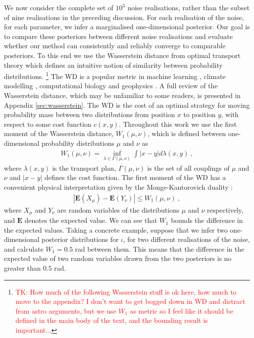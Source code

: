 \documentclass[fleqn,usenatbib,useAMS]{mnras}
\begin{document}
We now consider the complete set of $10^3$ noise realisations, rather than the subset of nine realisations in the preceding discussion. For each realisation of the noise, for each parameter, we infer a marginalised one-dimensional posterior. Our goal is to compare these posteriors between different noise realisations and evaluate whether our method can consistently and reliably converge to comparable posteriors. To this end we use the Wasserstein distance \citep[WD;][]{Wasserstein,Villani2009} from optimal transport theory which defines an intuitive notion of similarity between probability distributions. \footnote{\textcolor{red}{\tiny TK: How much of the following Wasserstein stuff is ok here, how much to move to the appendix? I don't want to get bogged down in WD and distract from astro arguments, but we use $W_1$ as metric so I feel like it should be defined in the main body of the text, and the bounding result is important...} \normalsize} The WD is a popular metric in machine learning \citep{2017arXiv170107875A}, climate modelling \citep{2022JCli...35.1215P,2023QJRMS.149..843K}, computational biology \citep{GONZALEZDELGADO2023168053} and geophysics \citep{2023GeoRL..5003880M}. A full review of the Wasserstein distance, which may be unfamiliar to some readers, is presented in Appendix \ref{sec:wasserstein}. The WD is the cost of an optimal strategy for moving probability mass between two distributions from position $x$ to position $y$, with respect to some cost function $c(x,y)$. Throughout this work we use the first moment of the Wasserstein distance, $W_1(\mu,\nu)$, which is defined between one-dimensional probability distributions $\mu$ and $\nu$ as
\begin{eqnarray}
	W_1(\mu,\nu)=  \inf_{\lambda \in \Gamma(\mu, \nu)} \int |x-y| d \lambda (x,y) \ ,
\end{eqnarray}
where $\lambda(x,y)$ is the transport plan, $\Gamma(\mu, \nu)$ is the set of all couplings of $\mu$ and $\nu$ and $ |x-y|$ defines the cost function. The first moment of the WD has a convenient physical interpretation given by the Monge-Kantorovich duality \citep{villani2003topics,Villani2009}:
\begin{eqnarray}
	| \boldsymbol{E}(X_{\mu} )-\boldsymbol{E}(Y_{\nu} ) | \leq W_1(\mu, \nu) \ , \label{eq:WDdefn}
\end{eqnarray}
where $X_{\mu}$ and $Y_{\nu}$ are random variables of the distributions $\mu$ and $\nu$ respectively, and $\boldsymbol{E}$ denotes the expected value. We can see that $W_1$ bounds the difference in the expected values. Taking a concrete example, suppose that we infer two one-dimensional posterior distributions for $\iota$, for two different realisations of the noise, and calculate $W_1 =0.5$ rad between them. This means that the difference in the expected value of two random variables drawn from the two posteriors is no greater than $0.5$ rad. \newline 
\end{document}
